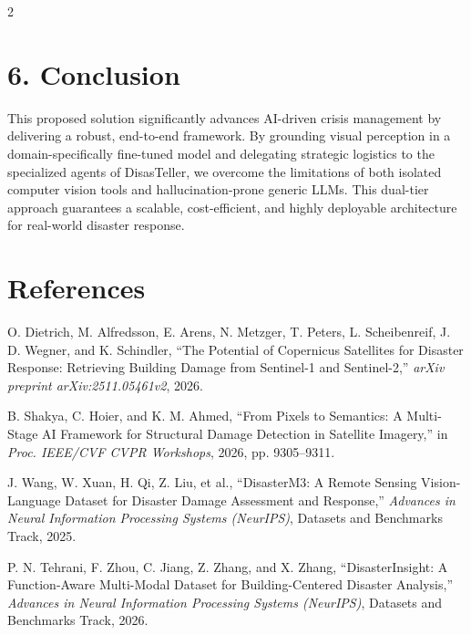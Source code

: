 \documentclass[11pt]{article}
\begin{document}
\begin{multicols}{2}
\section*{6. Conclusion}
This proposed solution significantly advances AI-driven crisis management by delivering a robust, end-to-end framework. By grounding visual perception in a domain-specifically fine-tuned model and delegating strategic logistics to the specialized agents of DisasTeller, we overcome the limitations of both isolated computer vision tools and hallucination-prone generic LLMs. This dual-tier approach guarantees a scalable, cost-efficient, and highly deployable architecture for real-world disaster response.

\section*{References}
\begin{enumerate}[label={[\arabic*]}, leftmargin=*]
    \item O. Dietrich, M. Alfredsson, E. Arens, N. Metzger, T. Peters, L. Scheibenreif, J. D. Wegner, and K. Schindler, ``The Potential of Copernicus Satellites for Disaster Response: Retrieving Building Damage from Sentinel-1 and Sentinel-2,'' \textit{arXiv preprint arXiv:2511.05461v2}, 2026.
    
    \item B. Shakya, C. Hoier, and K. M. Ahmed, ``From Pixels to Semantics: A Multi-Stage AI Framework for Structural Damage Detection in Satellite Imagery,'' in \textit{Proc. IEEE/CVF CVPR Workshops}, 2026, pp. 9305--9311.
    
    \item J. Wang, W. Xuan, H. Qi, Z. Liu, et al., ``DisasterM3: A Remote Sensing Vision-Language Dataset for Disaster Damage Assessment and Response,'' \textit{Advances in Neural Information Processing Systems (NeurIPS)}, Datasets and Benchmarks Track, 2025.
    
    \item P. N. Tehrani, F. Zhou, C. Jiang, Z. Zhang, and X. Zhang, ``DisasterInsight: A Function-Aware Multi-Modal Dataset for Building-Centered Disaster Analysis,'' \textit{Advances in Neural Information Processing Systems (NeurIPS)}, Datasets and Benchmarks Track, 2026.
\end{enumerate}

\end{multicols}
\end{document}

